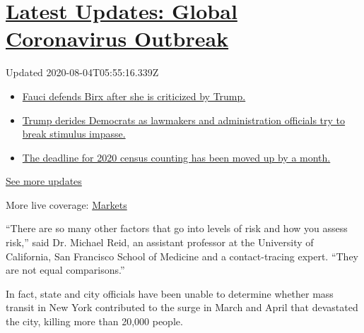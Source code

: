 \hypertarget{latest-updates-global-coronavirus-outbreak}{%
\section{\texorpdfstring{\href{https://www.nytimes.com/2020/08/03/world/coronavirus-covid-19.html?action=click\&pgtype=Article\&state=default\&region=MAIN_CONTENT_1\&context=storylines_live_updates}{Latest
Updates: Global Coronavirus
Outbreak}}{Latest Updates: Global Coronavirus Outbreak}}\label{latest-updates-global-coronavirus-outbreak}}

Updated 2020-08-04T05:55:16.339Z

\begin{itemize}
\tightlist
\item
  \href{https://www.nytimes.com/2020/08/03/world/coronavirus-covid-19.html?action=click\&pgtype=Article\&state=default\&region=MAIN_CONTENT_1\&context=storylines_live_updates\#link-4547638f}{Fauci
  defends Birx after she is criticized by Trump.}
\item
  \href{https://www.nytimes.com/2020/08/03/world/coronavirus-covid-19.html?action=click\&pgtype=Article\&state=default\&region=MAIN_CONTENT_1\&context=storylines_live_updates\#link-15e7f995}{Trump
  derides Democrats as lawmakers and administration officials try to
  break stimulus impasse.}
\item
  \href{https://www.nytimes.com/2020/08/03/world/coronavirus-covid-19.html?action=click\&pgtype=Article\&state=default\&region=MAIN_CONTENT_1\&context=storylines_live_updates\#link-e5a2cda}{The
  deadline for 2020 census counting has been moved up by a month.}
\end{itemize}

\href{https://www.nytimes.com/2020/08/03/world/coronavirus-covid-19.html?action=click\&pgtype=Article\&state=default\&region=MAIN_CONTENT_1\&context=storylines_live_updates}{See
more updates}

More live coverage:
\href{https://www.nytimes.com/live/2020/08/03/business/stock-market-today-coronavirus?action=click\&pgtype=Article\&state=default\&region=MAIN_CONTENT_1\&context=storylines_live_updates}{Markets}

``There are so many other factors that go into levels of risk and how
you assess risk,'' said Dr. Michael Reid, an assistant professor at the
University of California, San Francisco School of Medicine and a
contact-tracing expert. ``They are not equal comparisons.''

In fact, state and city officials have been unable to determine whether
mass transit in New York contributed to the surge in March and April
that devastated the city, killing more than 20,000 people.

